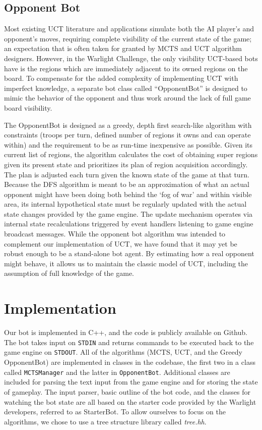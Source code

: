 \documentclass[a4paper,11pt]{article}
\newcommand{\code}[1]{\texttt{#1}}
\begin{document}
\subsection{Opponent Bot}\label{sec:oppbot}
Most existing UCT literature and applications simulate both the AI player's and opponent's
moves, requiring complete visibility of the current state of the game; an expectation that
is often taken for granted by MCTS and UCT algorithm designers. However, in the Warlight 
Challenge, the only visibility UCT-based bots have is the regions which are immediately 
adjacent to its owned regions on the board. To compensate for the added complexity of 
implementing UCT with imperfect knowledge, a separate bot class called ``OpponentBot'' is 
designed to mimic the behavior of the opponent and thus work around the lack of full game 
board visibility.

The OpponentBot is designed as a greedy, depth first search-like algorithm with constraints 
(troops per turn, defined number of regions it owns and can operate within) and the requirement 
to be as run-time inexpensive as possible. Given its current list of regions, the algorithm calculates
the cost of obtaining super regions given its present state and prioritizes its plan of
region acquisition accordingly. The plan is adjusted each turn given the known state of the 
game at that turn. Because the DFS algorithm is meant to be an approximation of what an
actual opponent might have been doing both behind the `fog of war' and within visible area, 
its internal hypothetical state must be regularly updated with the actual state changes
provided by the game engine.  The update mechanism operates via internal state recalculations 
triggered by event handlers listening to game engine broadcast messages. While the
opponent bot algorithm was intended to complement our implementation of UCT, we have found 
that it may yet be robust enough to be a stand-alone bot agent. By estimating how a real 
opponent might behave, it allows us to maintain the classic model of UCT, including the 
assumption of full knowledge of the game.

\section{Implementation}\label{sec:impl}
Our bot is implemented in C++, and the code is publicly available on Github\cite{github}.  
The bot takes input on \code{STDIN} and returns commands to be executed back to the game 
engine on \code{STDOUT}.  All of the algorithms (MCTS, UCT, and the Greedy OpponentBot) are 
implemented in classes in the codebase, the first two in a class called \code{MCTSManager} 
and the latter in \code{OpponentBot}.  Additional classes are included for parsing the text 
input from the game engine and for storing the state of gameplay.  The input parser, basic 
outline of the bot code, and the classes for watching the bot state are all based on the 
starter code provided by the Warlight developers, referred to as StarterBot.  To allow ourselves 
to focus on the algorithms, we chose to use a tree structure library called \emph{tree.hh}\cite{treehh}.
\end{document}
